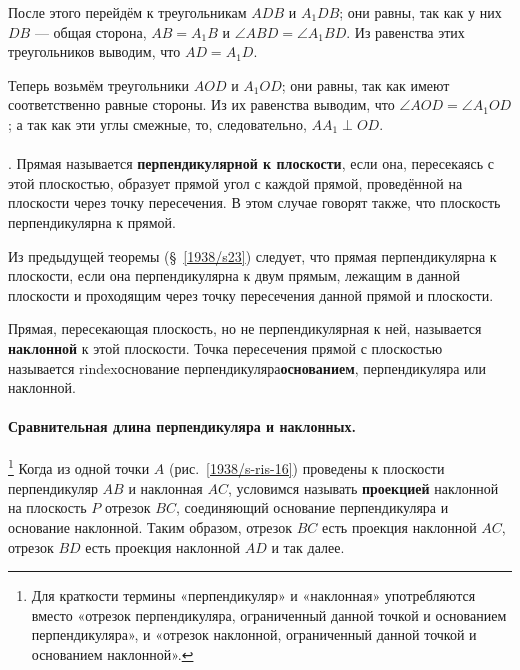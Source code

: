 После этого перейдём к треугольникам $ADB$ и $A_1DB$;
они равны, так как у них $DB$ — общая сторона, $AB=A_1B$ и $\angle ABD=\angle A_1BD$.
Из равенства этих треугольников выводим, что $AD=A_1D$.

Теперь возьмём треугольники $AOD$ и $A_1OD$;
они равны, так как имеют соответственно равные стороны.
Из их равенства выводим, что $\angle AOD=\angle A_1OD$;
а так как эти углы смежные, то, следовательно, $AA_1\perp OD$.

\paragraph{}\label{1938/s24}
.
Прямая называется \textbf{перпендикулярной к плоскости}, если она, пересекаясь с этой плоскостью, образует прямой угол с каждой прямой, проведённой на плоскости через точку пересечения.
В этом случае говорят также, что плоскость перпендикулярна к прямой.

Из предыдущей теоремы (§~\ref{1938/s23}) следует, что прямая перпендикулярна к плоскости, если она перпендикулярна к двум прямым, лежащим в данной плоскости и проходящим через точку пересечения данной прямой и плоскости.

Прямая, пересекающая плоскость, но не перпендикулярная к ней, называется \textbf{наклонной} к этой плоскости.
Точка пересечения прямой с плоскостью называется rindex{основание перпендикуляра}\textbf{основанием}, перпендикуляра или наклонной.


\paragraph{Сравнительная длина перпендикуляра и наклонных.}\label{1938/s25}%
\footnote{Для краткости термины «перпендикуляр» и «наклонная» употребляются вместо «отрезок перпендикуляра, ограниченный данной точкой и основанием перпендикуляра», и «отрезок наклонной, ограниченный данной точкой и основанием наклонной».}
Когда из одной точки $A$ (рис.~\ref{1938/s-ris-16}) проведены к плоскости перпендикуляр $AB$ и наклонная $AC$, условимся называть \textbf{проекцией} наклонной на плоскость $P$ отрезок $BC$, соединяющий основание перпендикуляра и основание наклонной.
Таким образом, отрезок $BC$ есть проекция наклонной $AC$, отрезок $BD$ есть проекция наклонной $AD$ и так далее.

\medskip

